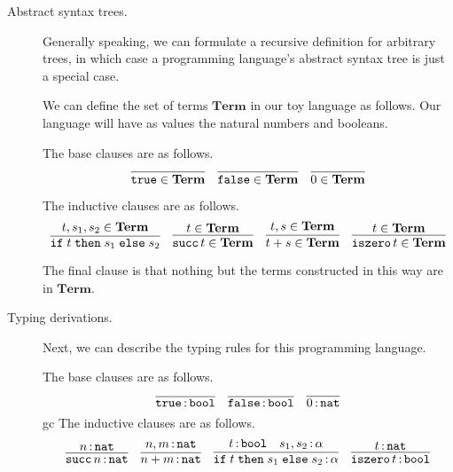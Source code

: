 \documentclass[11pt,letterpaper]{article}
\begin{document}
\begin{description}
    \newcommand{\terms}{\mathbf{Term}}
    \newcommand{\true}{\mathtt{true}}
    \newcommand{\false}{\mathtt{false}}
    \newcommand{\Succ}{\operatorname{\mathtt{succ}}}
    \newcommand{\iszero}{\operatorname{\mathtt{iszero}}}
    \newcommand{\ifthenelse}[3]{%
        \mathtt{if}\; #1 \;\mathtt{then}\; #2 \;\mathtt{else}\; #3%
    }
    \newcommand{\bool}{\mathtt{bool}}
    \newcommand{\nat}{\mathtt{nat}}
    \item[Abstract syntax trees.]
        Generally speaking, we can formulate a recursive definition for
        arbitrary trees, in which case a programming language's abstract syntax
        tree is just a special case.

        We can define the set of terms $\terms$ in our toy language as follows.
        Our language will have as values the natural numbers and booleans.

        The base clauses are as follows.
        $$
        \infer{\true \in \terms}{}
        \quad
        \infer{\false \in \terms}{}
        \quad
        \infer{0 \in \terms}{}
        $$

        The inductive clauses are as follows.
        $$
        \infer{\ifthenelse{t}{s_1}{s_2}}{t, s_1, s_2 \in \terms}
        \quad
        \infer{\Succ t \in \terms}{t \in \terms}
        \quad
        \infer{t + s \in \terms}{t, s \in \terms}
        \quad
        \infer{\iszero t \in \terms}{t \in \terms}
        $$

        The final clause is that nothing but the terms constructed in this way
        are in $\terms$.

    \item[Typing derivations.]
        Next, we can describe the typing rules for this programming language.

        The base clauses are as follows.
        $$
        \infer{\true \hastype \bool}{}
        \quad
        \infer{\false \hastype \bool}{}
        \quad
        \infer{0 \hastype \nat}{}
        $$
gc
        The inductive clauses are as follows.
        $$
        \infer{\Succ n \hastype \nat}{n \hastype \nat}
        \quad
        \infer{n + m \hastype \nat}{n, m \hastype \nat}
        \quad
        \infer{\ifthenelse{t}{s_1}{s_2} \hastype \alpha}{%
            t \hastype \bool
            &
            s_1, s_2 \hastype \alpha
        }
        \quad
        \infer{\iszero t \hastype \bool}{t \hastype \nat}
        $$


\end{description}
\end{document}
